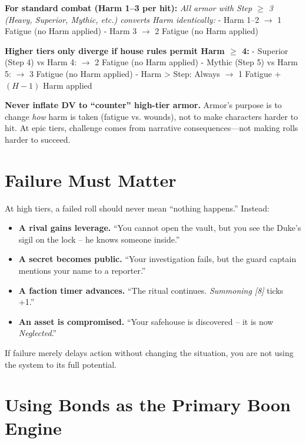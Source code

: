 \begin{tcolorbox}[colback=yellow!5!white, colframe=yellow!75!black, title={Important Context for Higher-Tier Armor},breakable]
\textbf{For standard combat (Harm 1--3 per hit):}  
\emph{All armor with Step $\geq$ 3 (Heavy, Superior, Mythic, etc.) converts Harm identically:}  
- Harm 1--2 $\rightarrow$ 1 Fatigue (no Harm applied)  
- Harm 3 $\rightarrow$ 2 Fatigue (no Harm applied)  

\textbf{Higher tiers only diverge if house rules permit Harm $\geq$ 4:}  
- Superior (Step 4) vs Harm 4: $\rightarrow$ 2 Fatigue (no Harm applied)  
- Mythic (Step 5) vs Harm 5: $\rightarrow$ 3 Fatigue (no Harm applied)  
- Harm > Step: Always $\rightarrow$ 1 Fatigue + $(H - 1)$ Harm applied  

\textbf{Never inflate DV to ``counter'' high-tier armor.} Armor's purpose is to change \textit{how} harm is taken (fatigue vs. wounds), not to make characters harder to hit. At epic tiers, challenge comes from narrative consequences---not making rolls harder to succeed.
\end{tcolorbox}

\section{Failure Must Matter}

At high tiers, a failed roll should never mean ``nothing happens.'' Instead:

\begin{itemize}
  \item \textbf{A rival gains leverage.} ``You cannot open the vault, but you see the Duke's sigil on the lock -- he knows someone inside.''
  \item \textbf{A secret becomes public.} ``Your investigation fails, but the guard captain mentions your name to a reporter.''
  \item \textbf{A faction timer advances.} ``The ritual continues. \emph{Summoning [8]} ticks +1.''
  \item \textbf{An asset is compromised.} ``Your safehouse is discovered -- it is now \emph{Neglected}.''
\end{itemize}

If failure merely delays action without changing the situation, you are not using the system to its full potential.

\section{Using Bonds as the Primary Boon Engine}

